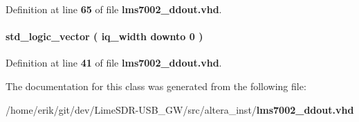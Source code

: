 Definition at line {\bf 65} of file {\bf lms7002\+\_\+ddout.\+vhd}.

\paragraph[{datout}]{ {\bfseries \textcolor{comment}{std\+\_\+logic\+\_\+vector}\textcolor{vhdlchar}{ }\textcolor{vhdlchar}{(}\textcolor{vhdlchar}{ }\textcolor{vhdlchar}{ }\textcolor{vhdlchar}{ }\textcolor{vhdlchar}{ }{\bfseries {\bf iq\+\_\+width}} \textcolor{vhdlchar}{ }\textcolor{keywordflow}{downto}\textcolor{vhdlchar}{ }\textcolor{vhdlchar}{ } \textcolor{vhdldigit}{0} \textcolor{vhdlchar}{ }\textcolor{vhdlchar}{)}\textcolor{vhdlchar}{ }} \hspace{0.3cm}{\ttfamily [Signal]}}\label{classlms7002__ddout_1_1arch_ab7be949ee139328902d51b2d9df4180d}


Definition at line {\bf 41} of file {\bf lms7002\+\_\+ddout.\+vhd}.



The documentation for this class was generated from the following file\+:\begin{DoxyCompactItemize}
\item 
/home/erik/git/dev/\+Lime\+S\+D\+R-\/\+U\+S\+B\+\_\+\+G\+W/src/altera\+\_\+inst/{\bf lms7002\+\_\+ddout.\+vhd}\end{DoxyCompactItemize}
